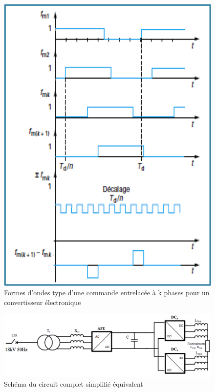 \begin{figure}[htb]
\centering
\includegraphics[scale=0.5]{fig/entrelacage.png}
\caption{Formes d'ondes type d'une commande entrelacée à k phases pour un convertisseur électronique}
\label{fig_entrelacage}
\end{figure}

\begin{figure}[htb]
\centering
\includegraphics[scale=0.5]{fig/fig_circuit_global.png}
\caption{Schéma du circuit complet simplifié équivalent}
\label{fig_circuit_global}
\end{figure}

